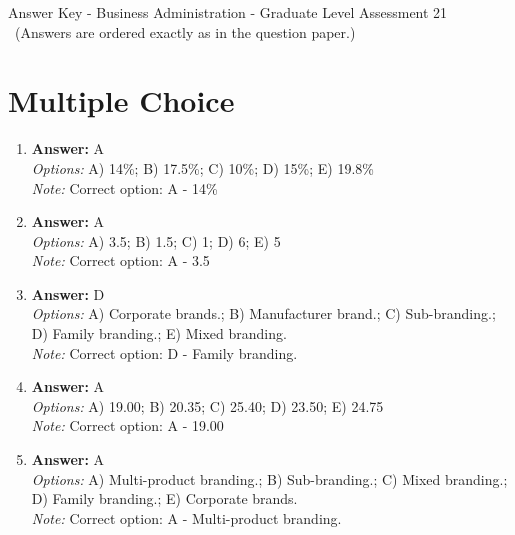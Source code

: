 \documentclass[12pt]{article}
\begin{document}
\begin{center}
Answer Key - Business Administration - Graduate Level Assessment 21 \
\small (Answers are ordered exactly as in the question paper.)
\end{center}

\section*{Multiple Choice}
\begin{enumerate}[label=\arabic*.]
\item \textbf{Answer:} A
\\ \textit{Options:} A) 14\%; B) 17.5\%; C) 10\%; D) 15\%; E) 19.8\%
\\ \textit{Note:} Correct option: A - 14\%
\item \textbf{Answer:} A
\\ \textit{Options:} A) 3.5; B) 1.5; C) 1; D) 6; E) 5
\\ \textit{Note:} Correct option: A - 3.5
\item \textbf{Answer:} D
\\ \textit{Options:} A) Corporate brands.; B) Manufacturer brand.; C) Sub-branding.; D) Family branding.; E) Mixed branding.
\\ \textit{Note:} Correct option: D - Family branding.
\item \textbf{Answer:} A
\\ \textit{Options:} A) 19.00; B) 20.35; C) 25.40; D) 23.50; E) 24.75
\\ \textit{Note:} Correct option: A - 19.00
\item \textbf{Answer:} A
\\ \textit{Options:} A) Multi-product branding.; B) Sub-branding.; C) Mixed branding.; D) Family branding.; E) Corporate brands.
\\ \textit{Note:} Correct option: A - Multi-product branding.
\end{enumerate}
\end{document}
